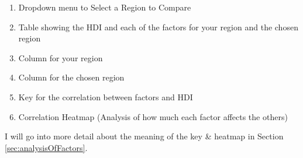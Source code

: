 \documentclass[12pt]{report}
\begin{document}
\begin{enumerate}
    \item Dropdown menu to Select a Region to Compare
    \item Table showing the HDI and each of the factors for your region and the chosen region
    \item Column for your region
    \item Column for the chosen region
    \item Key for the correlation between factors and HDI
    \item Correlation Heatmap (Analysis of how much each factor affects the others)
\end{enumerate}

I will go into more detail about the meaning of the key \& heatmap in Section \ref{sec:analysisOfFactors}.
\end{document}
